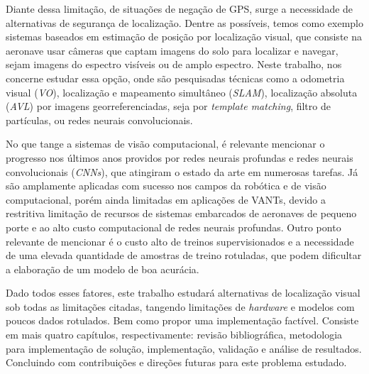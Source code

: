 Diante dessa limitação, de situações de negação de GPS, surge a necessidade de alternativas de segurança de localização. Dentre as possíveis, temos como exemplo sistemas baseados em estimação de posição por localização visual, que consiste na aeronave usar câmeras que captam imagens do solo para localizar e navegar, sejam imagens do espectro visíveis ou de amplo espectro. Neste trabalho, nos concerne estudar essa opção, onde são pesquisadas técnicas como a odometria visual (\textit{VO}), localização e mapeamento simultâneo (\textit{SLAM}), localização absoluta (\textit{AVL}) por imagens georreferenciadas, seja por \textit{template matching}, filtro de partículas, ou redes neurais convolucionais.

No que tange a sistemas de visão computacional, é relevante mencionar o progresso nos últimos anos providos por redes neurais profundas e redes neurais convolucionais (\textit{CNNs}), que atingiram o estado da arte em numerosas tarefas. Já são amplamente aplicadas com sucesso nos campos da robótica e de visão computacional, porém ainda limitadas em aplicações de VANTs, devido a restritiva limitação de recursos de sistemas embarcados de aeronaves de pequeno porte e ao alto custo computacional de redes neurais profundas. Outro ponto relevante de mencionar é o custo alto de treinos supervisionados e a necessidade de uma elevada quantidade de amostras de treino rotuladas, que podem dificultar a elaboração de um modelo de boa acurácia.

Dado todos esses fatores, este trabalho estudará alternativas de localização visual sob todas as limitações citadas, tangendo limitações de \textit{hardware} e modelos com poucos dados rotulados. Bem como propor uma implementação factível. Consiste em mais quatro capítulos, respectivamente: revisão bibliográfica, metodologia para implementação de solução, implementação, validação e análise de resultados. Concluindo com contribuições e direções futuras para este problema estudado.

